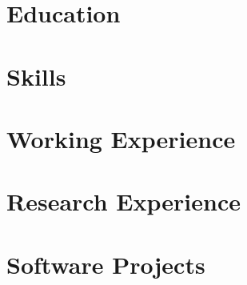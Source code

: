 \documentclass{resume}
\begin{document}

\newcommand{\equalcontrib}{$^{\dagger}$}




\section{Education}





\section{Skills}




\section{Working Experience}





\section{Research Experience}




\section{Software Projects}



\end{document}
